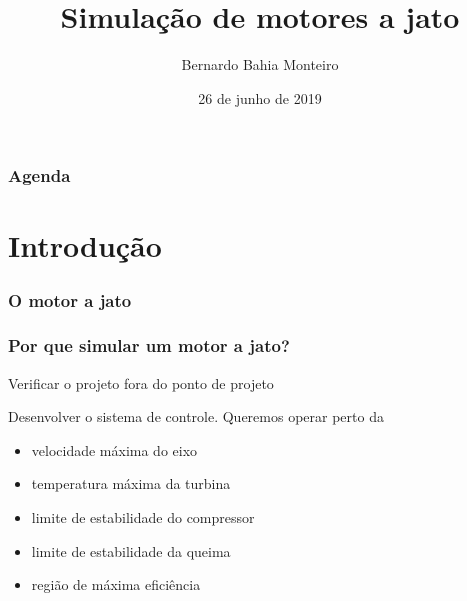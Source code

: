 \documentclass[aspectratio=1610]{beamer}
\title{Simulação de motores a jato}
\author{Bernardo Bahia Monteiro}
\institute{Universidade Federal de Minas Gerais}
\date{26 de junho de 2019}
\begin{document}
\maketitle

\begin{frame}
\frametitle{Agenda}
\tableofcontents
\end{frame}

\clearpage

\section{Introdução} %
\begin{frame}[t]
\frametitle{O motor a jato}
\centering



\end{frame}

\begin{frame}
\frametitle{Por que simular um motor a jato?}
Verificar o projeto fora do ponto de projeto

\vspace{1em}

Desenvolver o sistema de controle. Queremos operar perto da
    \begin{itemize}
        \item velocidade máxima do eixo
        \item temperatura máxima da turbina
        \item limite de estabilidade do compressor
        \item limite de estabilidade da queima
        \item região de máxima eficiência
    \end{itemize}
\end{frame}
\end{document}
